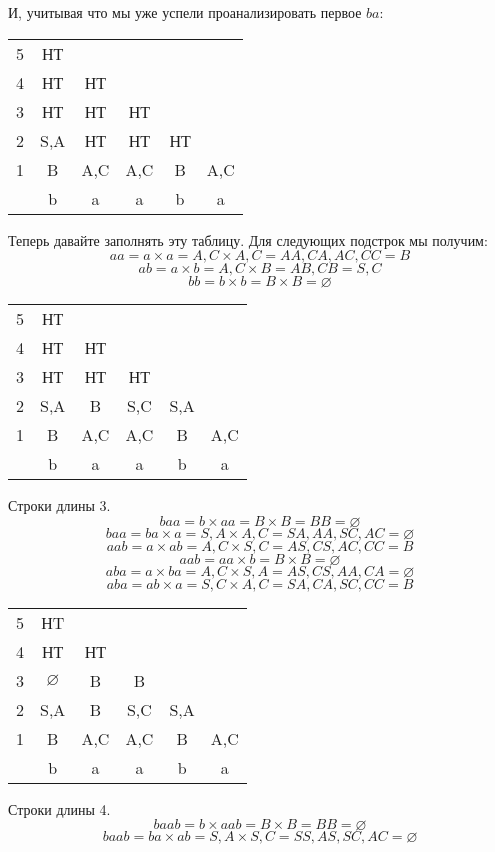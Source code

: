 \documentclass{article}
\begin{document}
И, учитывая что мы уже успели проанализировать первое $ba$:
\begin{center}
    \begin{tabular}{ c|c c c c c }
    5 & НТ  \\ 
    4 & НТ & НТ   \\  
    3 & НТ & НТ & НТ   \\  
    2 & S,A & НТ & НТ & НТ  \\  
    1 & B & A,C & A,C & B & A,C  \\
    \hline
      & b  &  a &  a & b  &  a 
    \end{tabular}
\end{center}
Теперь давайте заполнять эту таблицу. Для следующих подстрок мы получим:
$$aa = a\times a = A,C \times A,C = AA, CA, AC, CC = B$$
$$ab = a\times b = A,C \times B = AB, CB = S, C$$
$$bb = b\times b = B \times B = \varnothing$$
\begin{center}
    \begin{tabular}{ c|c c c c c }
    5 & НТ \\ 
    4 & НТ & НТ   \\  
    3 & НТ & НТ & НТ   \\  
    2 & S,A & B & S,C & S,A  \\  
    1 & B & A,C & A,C & B & A,C  \\
    \hline
      & b  &  a &  a & b  &  a 
    \end{tabular}
\end{center}
Строки длины 3.
$$baa = b\times aa = B \times B = BB = \varnothing$$
$$baa = ba\times a = S,A \times A,C = SA, AA, SC, AC = \varnothing$$
$$aab = a\times ab = A,C \times S,C = AS, CS, AC, CC = B$$
$$aab = aa\times b = B \times B = \varnothing$$
$$aba = a\times ba = A,C \times S,A = AS, CS, AA, CA = \varnothing$$
$$aba = ab\times a = S,C \times A,C = SA, CA, SC, CC = B$$
\begin{center}
    \begin{tabular}{ c|c c c c c }
    5 & НT \\ 
    4 & НТ & НТ   \\  
    3 & $\varnothing$ & B & B   \\  
    2 & S,A & B & S,C & S,A  \\  
    1 & B & A,C & A,C & B & A,C  \\
    \hline
      & b  &  a &  a & b  &  a 
    \end{tabular}
\end{center}
Строки длины 4.
$$baab = b\times aab = B \times B = BB = \varnothing$$
$$baab = ba\times ab = S,A \times S,C = SS, AS, SC, AC = \varnothing$$
\end{document}
